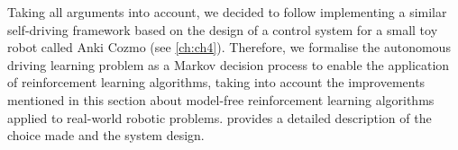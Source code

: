 Taking all arguments into account, we decided to follow \cite{kendall2019learning} implementing a similar self-driving framework based on the design of a control system for a small toy robot called Anki Cozmo (see \vref{ch:ch4}). Therefore, we formalise the autonomous driving learning problem as a Markov decision process to enable the application of reinforcement learning algorithms, taking into account the improvements mentioned in this section about model-free reinforcement learning algorithms applied to real-world robotic problems.  provides a detailed description of the choice made and the system design.







